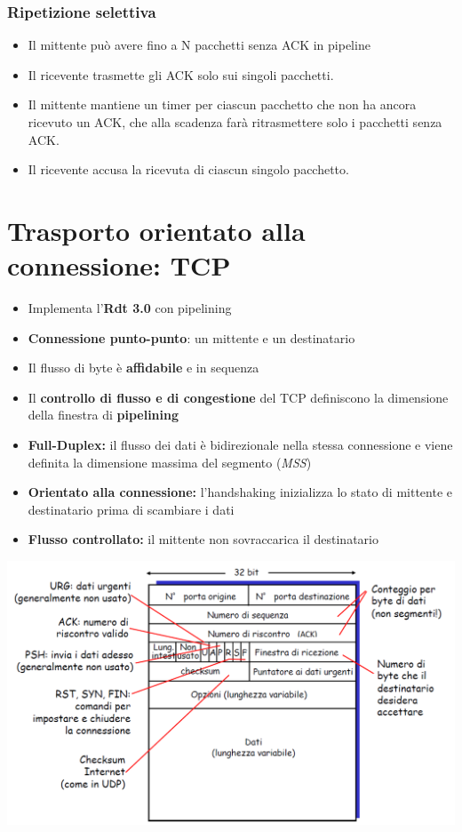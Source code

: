 \documentclass{report}
\begin{document}
	\subsubsection{Ripetizione selettiva}
	\begin{itemize}
		\item Il mittente può avere fino a N pacchetti senza ACK in pipeline
		\item Il ricevente trasmette gli ACK solo sui singoli pacchetti.
		\item Il mittente mantiene un timer per ciascun pacchetto che non ha ancora ricevuto un ACK, che alla scadenza farà ritrasmettere solo i pacchetti senza ACK.
		\item Il ricevente accusa la ricevuta di ciascun singolo pacchetto.
	\end{itemize}
	\section{Trasporto orientato alla connessione: TCP}
	\begin{itemize}
		\item Implementa l'\textbf{Rdt 3.0} con pipelining
		\item \textbf{Connessione punto-punto}: un mittente e un destinatario
		\item Il flusso di byte è \textbf{affidabile} e in sequenza
		\item Il \textbf{controllo di flusso e di congestione} del TCP definiscono la dimensione della finestra di \textbf{pipelining}
		\item \textbf{Full-Duplex:} il flusso dei dati è bidirezionale nella stessa connessione e viene definita la dimensione massima del segmento (\textit{MSS})
		\item \textbf{Orientato alla connessione:} l'handshaking inizializza lo stato di mittente e destinatario prima di scambiare i dati
		\item \textbf{Flusso controllato:} il mittente non sovraccarica il destinatario
	\end{itemize}
	\begin{center}
		\includegraphics[width=0.7\linewidth]{segmento-tcp}
	\end{center}
\end{document}

